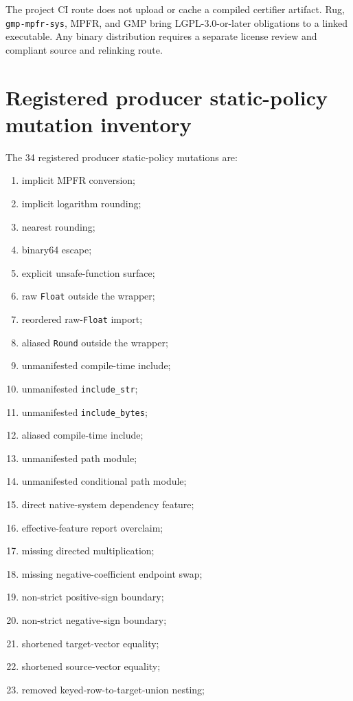 \documentclass[11pt]{article}
\theoremstyle{definition}
\begin{document}
The project CI route does not upload or cache a compiled certifier artifact.  Rug,
\texttt{gmp-mpfr-sys}, MPFR, and GMP bring LGPL-3.0-or-later obligations to a linked executable.
Any binary distribution requires a separate license review and compliant source and relinking
route.

\appendix

\section{Registered producer static-policy mutation inventory}

The 34 registered producer static-policy mutations are:
\begin{enumerate}[leftmargin=*]
  \item implicit MPFR conversion;
  \item implicit logarithm rounding;
  \item nearest rounding;
  \item binary64 escape;
  \item explicit unsafe-function surface;
  \item raw \texttt{Float} outside the wrapper;
  \item reordered raw-\texttt{Float} import;
  \item aliased \texttt{Round} outside the wrapper;
  \item unmanifested compile-time include;
  \item unmanifested \texttt{include\_str};
  \item unmanifested \texttt{include\_bytes};
  \item aliased compile-time include;
  \item unmanifested path module;
  \item unmanifested conditional path module;
  \item direct native-system dependency feature;
  \item effective-feature report overclaim;
  \item missing directed multiplication;
  \item missing negative-coefficient endpoint swap;
  \item non-strict positive-sign boundary;
  \item non-strict negative-sign boundary;
  \item shortened target-vector equality;
  \item shortened source-vector equality;
  \item removed keyed-row-to-target-union nesting;

\end{enumerate}
\end{document}
